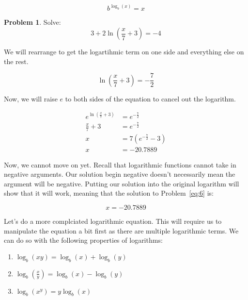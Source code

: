 \documentclass[12pt]{article}
\theoremstyle{definition}
\newtheorem{problem}{Problem}
\begin{document}
\begin{equation}
    b^{\log_b(x)} = x
\end{equation}

\begin{problem}
Solve:
\begin{equation*}
    3 + 2\ln\left(\frac{x}{7}+3\right) = -4 \label{eq:6}
\end{equation*}
\end{problem}

We will rearrange to get the logartihmic term on one side and everything else on the rest.

\begin{equation}
    \ln\left(\frac{x}{7}+3\right) = -\frac{7}{2}
\end{equation}

Now, we will raise $e$ to both sides of the equation to cancel out the logarithm.

\begin{align}
    e^{\ln\left(\frac{x}{7}+3\right)} & = e^{-\frac{7}{2}}      \\
    \frac{x}{7}+3                     & = e^{-\frac{7}{2}}      \\
    x                                 & = 7(e^{-\frac{7}{2}}-3) \\
    x                                 & = -20.7889
\end{align}

Now, we cannot move on yet.
Recall that logarithmic functions cannot take in negative arguments.
Our solution begin negative doesn't necessarily mean the argument will be negative.
Putting our solution into the original logarithm will show that it will work, meaning that the solution to Problem~\eqref{eq:6} is:

\begin{equation}
    x = -20.7889
\end{equation}

Let's do a more complciated logarithmic equation.
This will require us to manipulate the equation a bit first as there are multiple logarithmic terms.
We can do so with the following properties of logarithms:

\begin{enumerate}
    \item $\log_b(xy) = \log_b(x) + \log_b(y)$
    \item $\log_b\left(\frac{x}{y}\right) = \log_b(x) - \log_b(y)$
    \item $\log_b(x^y) = y\log_b(x)$
\end{enumerate}
\end{document}
